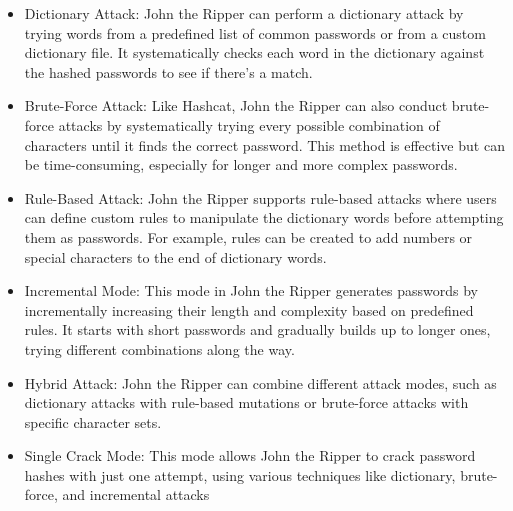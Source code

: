 \documentclass[10pt,oneside,english,a4paper]{article}
\begin{document}
\begin{itemize}
\item Dictionary Attack: John the Ripper can perform a dictionary attack by trying words from a predefined list of common passwords or from a custom dictionary file. It systematically checks each word in the dictionary against the hashed passwords to see if there's a match.

\item Brute-Force Attack: Like Hashcat, John the Ripper can also conduct brute-force attacks by systematically trying every possible combination of characters until it finds the correct password. This method is effective but can be time-consuming, especially for longer and more complex passwords.

\item Rule-Based Attack: John the Ripper supports rule-based attacks where users can define custom rules to manipulate the dictionary words before attempting them as passwords. For example, rules can be created to add numbers or special characters to the end of dictionary words.

\item Incremental Mode: This mode in John the Ripper generates passwords by incrementally increasing their length and complexity based on predefined rules. It starts with short passwords and gradually builds up to longer ones, trying different combinations along the way.

\item Hybrid Attack: John the Ripper can combine different attack modes, such as dictionary attacks with rule-based mutations or brute-force attacks with specific character sets.

\item Single Crack Mode: This mode allows John the Ripper to crack password hashes with just one attempt, using various techniques like dictionary, brute-force, and incremental attacks
\end{itemize}
\end{document}
